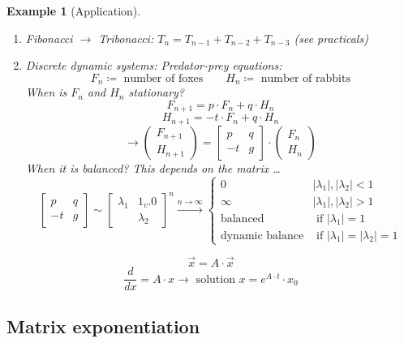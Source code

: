\documentclass[a4paper]{article}
\newcounter{lecref}[section]
\numberwithin{lecref}{section}
\newtheorem{example}[lecref]{Example}
\newcommand{\card}[1]{\left|#1\right|}
\begin{document}
\begin{example}[Application] \hfill{}
  \begin{enumerate}
    \item Fibonacci $\to$ Tribonacci: $T_n = T_{n-1} + T_{n-2} + T_{n-3}$ (see practicals)
    \item Discrete dynamic systems: Predator-prey equations:
      \[ F_n \coloneqq \text{ number of foxes} \qquad H_n \coloneqq \text{ number of rabbits} \]
      When is $F_n$ and $H_n$ stationary?
      \[ F_{n+1} = p \cdot F_n + q \cdot H_n \]
      \[ H_{n+1} = -t \cdot F_n + q \cdot H_n \]
      \[ \to \begin{pmatrix} F_{n+1} \\ H_{n+1} \end{pmatrix} = \begin{bmatrix} p & q \\ -t & g \end{bmatrix} \cdot \begin{pmatrix} F_n \\ H_n \end{pmatrix} \]
      When it is balanced? This depends on the matrix \dots
      \[
        \begin{bmatrix} p & q \\ -t & g \end{bmatrix} \sim \begin{bmatrix} \lambda_1 & 1_v.0 \\ & \lambda_2 \end{bmatrix}^n
        \xrightarrow{n \to \infty} \begin{cases}
          0 & \card{\lambda_1}, \card{\lambda_2} < 1 \\
          \infty & \card{\lambda_1}, \card{\lambda_2} > 1 \\
          \text{balanced} & \text{ if } \card{\lambda_1} = 1 \\
          \text{dynamic balance} & \text{ if } \card{\lambda_1} = \card{\lambda_2} = 1
        \end{cases}
      \]
  \end{enumerate}
  \[ \vec x = A \cdot \vec x \]
  \[ \frac{d}{dx} = A \cdot x \rightarrow \text{ solution } x = e^{A \cdot t} \cdot x_0 \]
\end{example}

\subsection{Matrix exponentiation}
\end{document}
